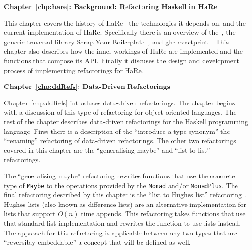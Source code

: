 \DIFaddend \textbf{Chapter~\ref{chp:hare}: Background: Refactoring Haskell in HaRe}

This chapter covers the history of HaRe \DIFaddbegin {}\textbf{}\textbf{}\DIFaddend , the technologies it depends on, and the current implementation of HaRe. Specifically there is an overview of the\DIFdelbegin {}\DIFdelend ~\citep{ghcApi}, the generic traversal library Scrap Your Boilerplate~\citep{syb}, and ghc-exactprint~\citep{exactprint}. This chapter also describes how the inner workings of HaRe are implemented and the functions that compose its API. Finally it discuses the design and development process of implementing refactorings for HaRe.

\textbf{Chapter~\ref{chp:ddRefs}: Data-Driven Refactorings}

Chapter~\ref{chp:ddRefs} introduces data-driven refactorings. The chapter begins with a discussion of this type of refactoring for object-oriented languages. The rest of the chapter describes data-driven refactorings for the Haskell programming language. First there is a description of the ``introduce a type synonym\DIFaddbegin \DIFadd{,}\DIFaddend '' the ``renaming'' refactoring of data-driven refactorings. The \DIFaddbegin {}\DIFaddend other two refactorings covered in this chapter are the ``generalising maybe'' and ``list to \DIFdelbegin {}\DIFdelend \DIFaddbegin {}\DIFaddend list'' refactorings.

The ``generalising maybe'' refactoring \DIFaddbegin {}\DIFaddend rewrites functions that use the concrete type of \texttt{Maybe} to \DIFdelbegin {}\DIFdelend \DIFaddbegin {}\DIFaddend the operations provided by the \DIFdelbegin {}\DIFdelend \DIFaddbegin {}\DIFaddend \texttt{Monad} and/or \texttt{MonadPlus}. The final refactoring described by this chapter is the ``list to Hughes list'' refactoring \DIFaddbegin {}\DIFaddend . Hughes lists (also known as difference lists) are an alternative implementation for lists that support $O(n)$ time appends. This refactoring takes functions that use that standard list implementation and rewrites the function to use \DIFdelbegin {}\DIFdelend \DIFaddbegin {}\DIFaddend lists instead. The approach for this refactoring is applicable between any two types that are ``reversibly embeddable'' a concept that will be defined as well.


